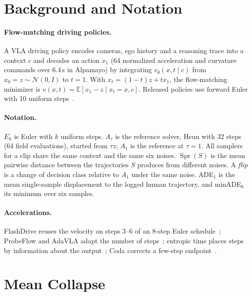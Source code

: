 \documentclass{article}
\theoremstyle{plain}
\theoremstyle{definition}
\theoremstyle{remark}
\newcommand{\Aref}{A_{1}}
\newcommand{\Atau}{A_{\tau}}
\newcommand{\Spr}{\operatorname{Spr}}
\newcommand{\E}{\mathbb{E}}
\begin{document}
\section{Background and Notation}
\label{sec:background}

\paragraph{Flow-matching driving policies.} A VLA driving policy encodes cameras, ego history and a reasoning trace into a context $c$ and decodes an action $x_1$ (64 normalized acceleration and curvature commands over 6.4\,s in Alpamayo) by integrating $v_\theta(x,t\mid c)$ from $x_0=z\sim\mathcal{N}(0,I)$ to $t=1$. With $x_t=(1-t)z+tx_1$, the flow-matching minimizer is $v(x,t)=\E[x_1-z\mid x_t=x,c]$. Released policies use forward Euler with 10 uniform steps~\citep{alpamayo2025,qwendrive2026}.

\paragraph{Notation.} $E_k$ is Euler with $k$ uniform steps. $\Atau$ is the reference solver, Heun with 32 steps (64 field evaluations), started from $\tau z$; $\Aref$ is the reference at $\tau=1$. All samplers for a clip share the same context and the same six noises. $\Spr(S)$ is the mean pairwise distance between the trajectories $S$ produces from different noises. A \emph{flip} is a change of decision class relative to $\Aref$ under the same noise. ADE$_1$ is the mean single-sample displacement to the logged human trajectory, and minADE$_6$ its minimum over six samples.

\paragraph{Accelerations.} FlashDrive reuses the velocity on steps 3--6 of an 8-step Euler schedule~\citep{flashdrive2026}; ProbeFlow and AdaVLA adapt the number of steps~\citep{probeflow2026,adavla2026}; entropic time places steps by information about the output~\citep{stancevic2025entropic}; Coda corrects a few-step endpoint~\citep{coda2026}.

\section{Mean Collapse}
\label{sec:theory}
\end{document}
